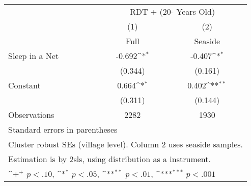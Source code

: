 {
\def\sym#1{\ifmmode^{#1}\else\(^{#1}\)\fi}
\begin{tabular}{l*{2}{c}}
\hline\hline
                    &\multicolumn{2}{c}{RDT + (20- Years Old)}  \\
                    &\multicolumn{1}{c}{(1)}         &\multicolumn{1}{c}{(2)}         \\
                    &        Full         &     Seaside         \\
\hline
Sleep in a Net      &      -0.692\sym{*}  &      -0.407\sym{*}  \\
                    &     (0.344)         &     (0.161)         \\
[1em]
Constant            &       0.664\sym{*}  &       0.402\sym{**} \\
                    &     (0.311)         &     (0.144)         \\
\hline
Observations        &        2282         &        1930         \\
\hline\hline
\multicolumn{3}{l}{\footnotesize Standard errors in parentheses}\\
\multicolumn{3}{l}{\footnotesize Cluster robust SEs (village level). Column 2 uses seaside samples.}\\
\multicolumn{3}{l}{\footnotesize Estimation is by 2sls, using distribution as a instrument.}\\
\multicolumn{3}{l}{\footnotesize \sym{+} \(p<.10\), \sym{*} \(p<.05\), \sym{**} \(p<.01\), \sym{***} \(p<.001\)}\\
\end{tabular}
}

